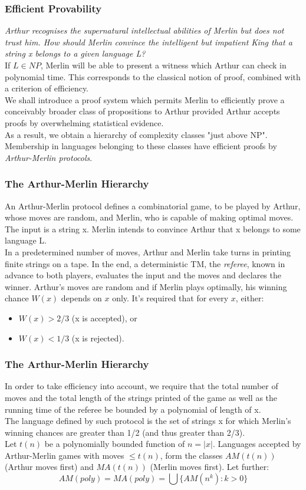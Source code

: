 \documentclass{beamer}
\begin{document}
\begin{frame}
\frametitle{Efficient Provability}
\textit{Arthur recognises the supernatural intellectual abilities of Merlin but does not trust him. How should Merlin convince the intelligent but impatient King that a string x belongs to a given language L?}\\
If $L \in NP$, Merlin will be able to present a witness which Arthur can check in polynomial time. This corresponds to the classical notion of proof, combined with a criterion of efficiency.\\
We shall introduce a proof system which permits Merlin to efficiently prove a conceivably broader class of propositions to Arthur provided Arthur accepts proofs by overwhelming statistical evidence.\\
As a result, we obtain a hierarchy of complexity classes "just above NP". Membership in languages belonging to these classes have efficient proofs by \textit{Arthur-Merlin protocols}.
\end{frame}

\begin{frame}
\frametitle{The Arthur-Merlin Hierarchy}
An Arthur-Merlin protocol defines a combinatorial game, to be played by Arthur, whose moves are random, and Merlin, who is capable of making optimal moves.\\
The input is a string x. Merlin intends to convince Arthur that x belongs to some language L.\\
In a predetermined number of moves, Arthur and Merlin take turns in printing finite strings on a tape. In the end, a deterministic TM, the \textit{referee}, known in advance to both players, evaluates the input and the moves and declares the winner. Arthur's moves are random and if Merlin plays optimally, his winning chance $W(x)$ depends on $x$ only. It's required that for every $x$, either:
\begin{itemize}
	\item $W(x) > 2/3$ (x is accepted), or
    \item $W(x) < 1/3$ (x is rejected).
\end{itemize}
\end{frame}

\begin{frame}
\frametitle{The Arthur-Merlin Hierarchy}
In order to take efficiency into account, we require that the total number of moves and the total length of the strings printed of the game as well as the running time of the referee be bounded by a polynomial of length of x.\\
The language defined by such protocol is the set of strings x for which Merlin's winning chances are greater than 1/2 (and thus greater than 2/3).\\
Let $t(n)$ be a polynomially bounded function of $n = |x|$. Languages accepted by Arthur-Merlin games with moves $\leq t(n)$, form the classes $AM(t(n))$ (Arthur moves first) and $MA(t(n))$ (Merlin moves first). Let further:
$$AM(poly) = MA(poly) = \bigcup \{AM(n^k): k > 0\}$$
\end{frame}
\end{document}
